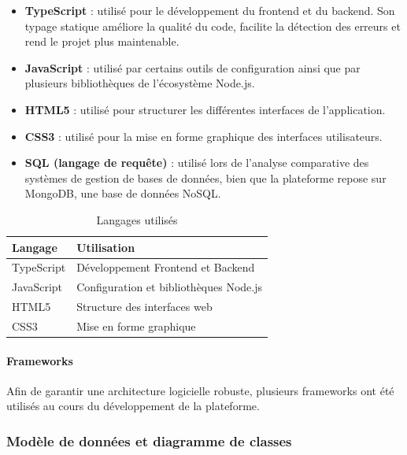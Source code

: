 \begin{itemize}

\item \textbf{TypeScript} : utilisé pour le développement du frontend et du backend. Son typage statique améliore la qualité du code, facilite la détection des erreurs et rend le projet plus maintenable.

\item \textbf{JavaScript} : utilisé par certains outils de configuration ainsi que par plusieurs bibliothèques de l'écosystème Node.js.

\item \textbf{HTML5} : utilisé pour structurer les différentes interfaces de l'application.

\item \textbf{CSS3} : utilisé pour la mise en forme graphique des interfaces utilisateurs.

\item \textbf{SQL (langage de requête)} : utilisé lors de l'analyse comparative des systèmes de gestion de bases de données, bien que la plateforme repose sur MongoDB, une base de données NoSQL.

\end{itemize} 
\begin{table}[H]
\centering
\renewcommand{\arraystretch}{1.3}
\begin{tabular}{|l|p{8cm}|}
\hline
\textbf{Langage} & \textbf{Utilisation} \\
\hline
TypeScript & Développement Frontend et Backend\\
\hline
JavaScript & Configuration et bibliothèques Node.js\\
\hline
HTML5 & Structure des interfaces web\\
\hline
CSS3 & Mise en forme graphique\\
\hline
\end{tabular}
\caption{Langages utilisés}
\label{tab:langages}
\end{table}

\paragraph{Frameworks}

Afin de garantir une architecture logicielle robuste, plusieurs frameworks ont été utilisés au cours du développement de la plateforme.

\fi

\subsubsection{Modèle de données et diagramme de classes}

